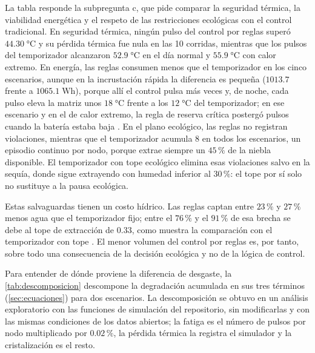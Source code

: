 La tabla responde la subpregunta c, que pide comparar la seguridad t\'ermica, la viabilidad energ\'etica y el respeto de las restricciones ecol\'ogicas con el control tradicional. En seguridad t\'ermica, ning\'un pulso del control por reglas super\'o $44.30\;\si{\celsius}$ y su p\'erdida t\'ermica fue nula en las 10 corridas, mientras que los pulsos del temporizador alcanzaron $52.9\;\si{\celsius}$ en el d\'ia normal y $55.9\;\si{\celsius}$ con calor extremo. En energ\'ia, las reglas consumen menos que el temporizador en los cinco escenarios, aunque en la incrustaci\'on r\'apida la diferencia es peque\~na ($1013.7$ frente a $1065.1\;\text{Wh}$), porque all\'i el control pulsa m\'as veces y, de noche, cada pulso eleva la matriz unos $18\;\si{\celsius}$ frente a los $12\;\si{\celsius}$ del temporizador; en ese escenario y en el de calor extremo, la regla de reserva cr\'itica posterg\'o pulsos cuando la bater\'ia estaba baja \parencite[doc.~04, \S~8.5]{axioma2026engine}. En el plano ecol\'ogico, las reglas no registran violaciones, mientras que el temporizador acumula 8 en todos los escenarios, un episodio continuo por nodo, porque extrae siempre un $45\,\%$ de la niebla disponible. El temporizador con tope ecol\'ogico elimina esas violaciones salvo en la sequ\'ia, donde sigue extrayendo con humedad inferior al $30\,\%$: el tope por s\'i solo no sustituye a la pausa ecol\'ogica.

Estas salvaguardas tienen un costo h\'idrico. Las reglas captan entre $23\,\%$ y $27\,\%$ menos agua que el temporizador fijo; entre el $76\,\%$ y el $91\,\%$ de esa brecha se debe al tope de extracci\'on de 0.33, como muestra la comparaci\'on con el temporizador con tope \parencite[doc.~04, \S~8.4]{axioma2026engine}. El menor volumen del control por reglas es, por tanto, sobre todo una consecuencia de la decisi\'on ecol\'ogica y no de la l\'ogica de control.

Para entender de d\'onde proviene la diferencia de desgaste, la \cref{tab:descomposicion} descompone la degradaci\'on acumulada en sus tres t\'erminos (\cref{sec:ecuaciones}) para dos escenarios. La descomposici\'on se obtuvo en un an\'alisis exploratorio con las funciones de simulaci\'on del repositorio, sin modificarlas y con las mismas condiciones de los datos abiertos; la fatiga es el n\'umero de pulsos por nodo multiplicado por $0.02\,\%$, la p\'erdida t\'ermica la registra el simulador y la cristalizaci\'on es el resto.

